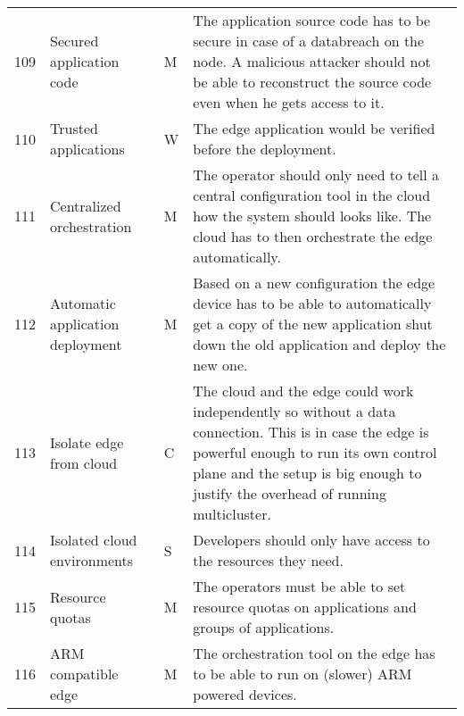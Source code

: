 \begin{longtable}{l p{3cm} p{0.8cm} p{8.5cm} }
109                     & Secured application code                & M      & The application source code has to be secure in case of a databreach on the node. A malicious attacker should not be able to reconstruct the source code even when he gets access to it.                                            \\
110                     & Trusted applications                    & W      & The edge application would be verified before the deployment.                                                                                                                                                                       \\
111                     & Centralized orchestration               & M      & The operator should only need to tell a central configuration tool in the cloud how the system should looks like. The cloud has to then orchestrate the edge automatically.                                                         \\
112                     & Automatic application deployment        & M      & Based on a new configuration the edge device has to be able to automatically get a copy of the new application shut down the old application and deploy the new one.                                                                \\
113                     & Isolate edge from cloud                 & C      & The cloud and the edge could work independently so without a data connection. This is in case the edge is powerful enough to run its own control plane and the setup is big enough to justify the overhead of running multicluster. \\
114                     & Isolated cloud environments             & S      & Developers should only have access to the resources they need.                                                                                                                                                                      \\
115                     & Resource quotas                         & M      & The operators must be able to set resource quotas on applications and groups of applications.                                                                                                                                       \\
116                     & ARM compatible edge                     & M      & The orchestration tool on the edge has to be able to run on (slower) ARM powered devices.                                                                                                                                           \\

\end{longtable}
